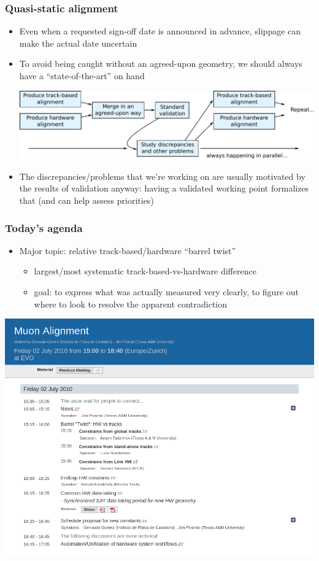 \documentclass[compress]{beamer}
\begin{document}
\begin{frame}
\frametitle{Quasi-static alignment}
\begin{itemize}
\item Even when a requested sign-off date is announced in advance, slippage
  can make the actual date uncertain

\item To avoid being caught without an agreed-upon geometry, we should
  always have a ``state-of-the-art'' on hand

\vspace{0.2 cm}
\includegraphics[width=\linewidth]{quasistatic.pdf}

\item The discrepancies/problems that we're working on are usually
  motivated by the results of validation anyway: having a validated
  working point formalizes that (and can help assess priorities)
\end{itemize}
\end{frame}

\begin{frame}
\frametitle{Today's agenda}
\begin{itemize}
\item Major topic: relative track-based/hardware ``barrel twist''

\begin{itemize}
\item largest/most systematic track-based-vs-hardware difference
\item goal: to express what was actually measured very clearly, to figure out where to look to resolve the apparent contradiction
\end{itemize}
\end{itemize}

\begin{center}
\includegraphics[width=0.75\linewidth]{agenda.png}
\end{center}
\end{frame}
\end{document}
